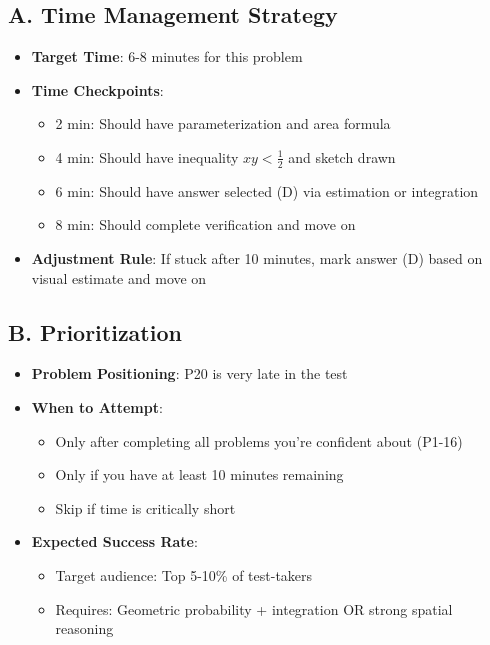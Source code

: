 \documentclass[11pt]{article}
\begin{document}
\begin{competitionbox}
\subsection*{A. Time Management Strategy}
\begin{itemize}[leftmargin=*]
    \item \textbf{Target Time}: 6-8 minutes for this problem
    \item \textbf{Time Checkpoints}:
    \begin{itemize}
        \item 2 min: Should have parameterization and area formula
        \item 4 min: Should have inequality $xy < \frac{1}{2}$ and sketch drawn
        \item 6 min: Should have answer selected (D) via estimation or integration
        \item 8 min: Should complete verification and move on
    \end{itemize}
    \item \textbf{Adjustment Rule}: If stuck after 10 minutes, mark answer (D) based on visual estimate and move on
\end{itemize}

\subsection*{B. Prioritization}
\begin{itemize}[leftmargin=*]
    \item \textbf{Problem Positioning}: P20 is very late in the test
    \item \textbf{When to Attempt}: 
    \begin{itemize}
        \item Only after completing all problems you're confident about (P1-16)
        \item Only if you have at least 10 minutes remaining
        \item Skip if time is critically short
    \end{itemize}
    \item \textbf{Expected Success Rate}: 
    \begin{itemize}
        \item Target audience: Top 5-10\% of test-takers
        \item Requires: Geometric probability + integration OR strong spatial reasoning
    \end{itemize}
\end{itemize}


\end{competitionbox}
\end{document}
